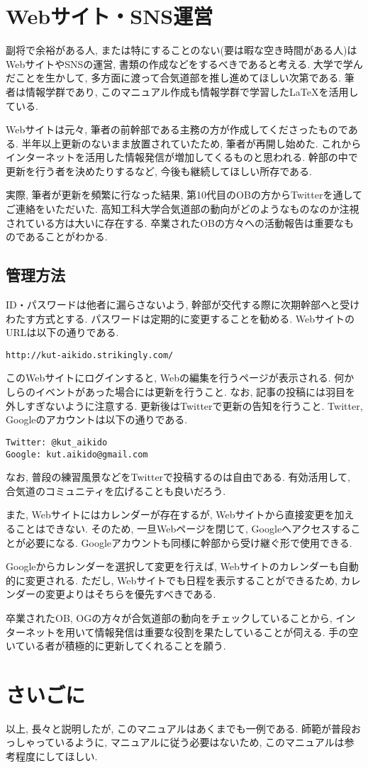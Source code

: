 \documentclass[a4j,titlepage]{jarticle}
\begin{document}
\section{Webサイト・SNS運営}
副将で余裕がある人, または特にすることのない(要は暇な空き時間がある人)はWebサイトやSNSの運営, 書類の作成などをするべきであると考える. 大学で学んだことを生かして, 多方面に渡って合気道部を推し進めてほしい次第である. 筆者は情報学群であり, このマニュアル作成も情報学群で学習した\LaTeX を活用している. \par
Webサイトは元々, 筆者の前幹部である主務の方が作成してくださったものである. 半年以上更新のないまま放置されていたため, 筆者が再開し始めた. これからインターネットを活用した情報発信が増加してくるものと思われる. 幹部の中で更新を行う者を決めたりするなど, 今後も継続してほしい所存である. \par
実際, 筆者が更新を頻繁に行なった結果, 第10代目のOBの方からTwitterを通してご連絡をいただいた. 高知工科大学合気道部の動向がどのようなものなのか注視されている方は大いに存在する. 卒業されたOBの方々への活動報告は重要なものであることがわかる.

\subsection{管理方法}
ID・パスワードは他者に漏らさないよう, 幹部が交代する際に次期幹部へと受けわたす方式とする. パスワードは定期的に変更することを勧める. WebサイトのURLは以下の通りである.

\begin{verbatim}
http://kut-aikido.strikingly.com/
\end{verbatim}

このWebサイトにログインすると, Webの編集を行うページが表示される. 何かしらのイベントがあった場合には更新を行うこと. なお, 記事の投稿には羽目を外しすぎないように注意する. 更新後はTwitterで更新の告知を行うこと. Twitter, Googleのアカウントは以下の通りである.

\begin{verbatim}
Twitter: @kut_aikido
Google: kut.aikido@gmail.com
\end{verbatim}

なお, 普段の練習風景などをTwitterで投稿するのは自由である. 有効活用して, 合気道のコミュニティを広げることも良いだろう. \par
また, Webサイトにはカレンダーが存在するが, Webサイトから直接変更を加えることはできない. そのため, 一旦Webページを閉じて, Googleへアクセスすることが必要になる. Googleアカウントも同様に幹部から受け継ぐ形で使用できる. \par
Googleからカレンダーを選択して変更を行えば, Webサイトのカレンダーも自動的に変更される. ただし, Webサイトでも日程を表示することができるため, カレンダーの変更よりはそちらを優先すべきである. \par
卒業されたOB, OGの方々が合気道部の動向をチェックしていることから, インターネットを用いて情報発信は重要な役割を果たしていることが伺える. 手の空いている者が積極的に更新してくれることを願う. 

\section{さいごに}
以上, 長々と説明したが, このマニュアルはあくまでも一例である. 師範が普段おっしゃっているように, マニュアルに従う必要はないため, このマニュアルは参考程度にしてほしい. 
\end{document}
